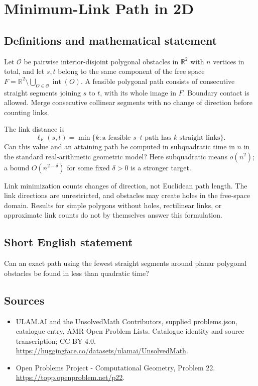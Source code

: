 \documentclass[11pt,a4paper]{article}
\begin{document}
\section*{Minimum-Link Path in 2D}\label{statement}

\subsection{Definitions and mathematical statement}
Let $\mathcal O$ be pairwise interior-disjoint polygonal obstacles in
$\mathbb R^2$ with $n$ vertices in total, and let $s,t$ belong to the
same component of the free space
$F=\mathbb R^2\setminus\bigcup_{O\in\mathcal O}\operatorname{int}(O)$.
A feasible polygonal path consists of consecutive straight segments
joining $s$ to $t$, with its whole image in $F$. Boundary contact is
allowed. Merge consecutive collinear segments with no change of
direction before counting links.

The link distance is
\[
 \ell_F(s,t)=\min\{k: \text{a feasible }s\text{--}t\text{ path has }k
                         \text{ straight links}\}.
\]
Can this value and an attaining path be computed in subquadratic time
in $n$ in the standard real-arithmetic geometric model? Here
subquadratic means $o(n^2)$; a bound $O(n^{2-\delta})$ for some fixed
$\delta>0$ is a stronger target.

Link minimization counts changes of direction, not Euclidean path
length. The link directions are unrestricted, and obstacles may create
holes in the free-space domain. Results for simple polygons without
holes, rectilinear links, or approximate link counts do not by themselves
answer this formulation.
\subsection{Short English statement}
Can an exact path using the fewest straight segments around planar
polygonal obstacles be found in less than quadratic time?
\subsection{Sources}
\begin{itemize}
\item[S1] ULAM.AI and the UnsolvedMath Contributors, supplied problems.json, catalogue entry, AMR Open Problem Lists. Catalogue identity and source transcription; CC BY 4.0.
\url{https://huggingface.co/datasets/ulamai/UnsolvedMath}.
\item[S2] Open Problems Project - Computational Geometry, Problem 22. 
\url{https://topp.openproblem.net/p22}.
\end{itemize}
\end{document}
